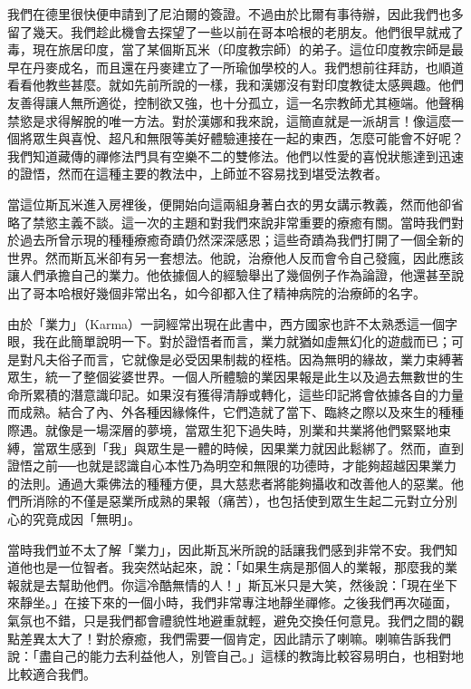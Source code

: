 我們在德里很快便申請到了尼泊爾的簽證。不過由於比爾有事待辦，因此我們也多留了幾天。我們趁此機會去探望了一些以前在哥本哈根的老朋友。他們很早就戒了毒，現在旅居印度，當了某個斯瓦米（印度教宗師）的弟子。這位印度教宗師是最早在丹麥成名，而且還在丹麥建立了一所瑜伽學校的人。我們想前往拜訪，也順道看看他教些甚麼。就如先前所說的一樣，我和漢娜沒有對印度教徒太感興趣。他們友善得讓人無所適從，控制欲又強，也十分孤立，這一名宗教師尤其極端。他聲稱禁慾是求得解脫的唯一方法。對於漢娜和我來說，這簡直就是一派胡言！像這麼一個將眾生與喜悅、超凡和無限等美好體驗連接在一起的東西，怎麼可能會不好呢？我們知道藏傳的禪修法門具有空樂不二的雙修法。他們以性愛的喜悅狀態達到迅速的證悟，然而在這種主要的教法中，上師並不容易找到堪受法教者。

當這位斯瓦米進入房裡後，便開始向這兩組身著白衣的男女講示教義，然而他卻省略了禁慾主義不談。這一次的主題和對我們來說非常重要的療癒有關。當時我們對於過去所曾示現的種種療癒奇蹟仍然深深感恩；這些奇蹟為我們打開了一個全新的世界。然而斯瓦米卻有另一套想法。他說，治療他人反而會令自己發瘋，因此應該讓人們承擔自己的業力。他依據個人的經驗舉出了幾個例子作為論證，他還甚至說出了哥本哈根好幾個非常出名，如今卻都入住了精神病院的治療師的名字。

由於「業力」（Karma）一詞經常出現在此書中，西方國家也許不太熟悉這一個字眼，我在此簡單說明一下。對於證悟者而言，業力就猶如虛無幻化的遊戲而已；可是對凡夫俗子而言，它就像是必受因果制裁的桎梏。因為無明的緣故，業力束縛著眾生，統一了整個娑婆世界。一個人所體驗的業因果報是此生以及過去無數世的生命所累積的潛意識印記。如果沒有獲得清靜或轉化，這些印記將會依據各自的力量而成熟。結合了內、外各種因緣條件，它們造就了當下、臨終之際以及來生的種種際遇。就像是一場深層的夢境，當眾生犯下過失時，別業和共業將他們緊緊地束縛，當眾生感到「我」與眾生是一體的時候，因果業力就因此鬆綁了。然而，直到證悟之前──也就是認識自心本性乃為明空和無限的功德時，才能夠超越因果業力的法則。通過大乘佛法的種種方便，具大慈悲者將能夠攝收和改善他人的惡業。他們所消除的不僅是惡業所成熟的果報（痛苦），也包括使到眾生生起二元對立分別心的究竟成因「無明」。

當時我們並不太了解「業力」，因此斯瓦米所說的話讓我們感到非常不安。我們知道他也是一位智者。我突然站起來，說：「如果生病是那個人的業報，那麼我的業報就是去幫助他們。你這冷酷無情的人！」斯瓦米只是大笑，然後說：「現在坐下來靜坐。」在接下來的一個小時，我們非常專注地靜坐禪修。之後我們再次碰面，氣氛也不錯，只是我們都會禮貌性地避重就輕，避免交換任何意見。我們之間的觀點差異太大了！對於療癒，我們需要一個肯定，因此請示了喇嘛。喇嘛告訴我們說：「盡自己的能力去利益他人，別管自己。」這樣的教誨比較容易明白，也相對地比較適合我們。

